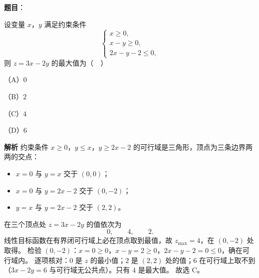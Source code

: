 \begin{answer}

\textbf{题目}：

设变量 $x$，$y$ 满足约束条件
\nopagebreak[4]
\[\begin{cases}x\geqslant 0,\\x-y\geqslant 0,\\2x-y-2\leqslant 0,\end{cases}\]
则 $z=3x-2y$ 的最大值为（　）

（A）$0$

（B）$2$

（C）$4$

（D）$6$

\textbf{解析}
约束条件 $x\geqslant0$，$y\leqslant x$，$y\geqslant2x-2$ 的可行域是三角形，顶点为三条边界两两的交点：
\begin{itemize}
\item $x=0$ 与 $y=x$ 交于 $(0,0)$；
\item $x=0$ 与 $y=2x-2$ 交于 $(0,-2)$；
\item $y=x$ 与 $y=2x-2$ 交于 $(2,2)$。
\end{itemize}

在三个顶点处 $z=3x-2y$ 的值依次为
\nopagebreak[4]
\[0,\qquad 4,\qquad 2.\]
线性目标函数在有界闭可行域上必在顶点取到最值，故 $z_{\max}=4$，在 $(0,-2)$ 处取得。
检验 $(0,-2)$：$x=0\geqslant0$，$x-y=2\geqslant0$，$2x-y-2=0\leqslant0$，确在可行域内。
逐项核对：$0$ 是 $z$ 的最小值；$2$ 是 $(2,2)$ 处的值；$6$ 在可行域上取不到（$3x-2y=6$ 与可行域无公共点）。只有 $4$ 是最大值。
故选 C。


\end{answer}
